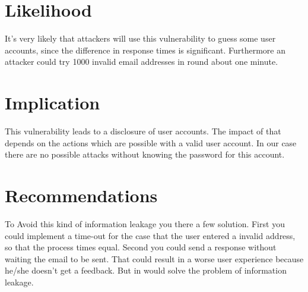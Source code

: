 \section{Likelihood}
It's very likely that attackers will use this vulnerability to guess some user accounts, since the difference in response times is significant. Furthermore an attacker could try 1000 invalid email addresses in round about one minute. 

\section{Implication} 
This vulnerability leads to a disclosure of user accounts. The impact of that depends on the actions which are possible with a valid user account. In our case there are no possible attacks without knowing the password for this account.


\section{Recommendations}
To Avoid this kind of information leakage you there a few solution. First you could implement a time-out for the case that the user entered a invalid address, so that the process times equal. Second you could send a response without waiting the email to be sent.
That could result in a worse user experience because he/she doesn't get a feedback. But in would solve the problem of information leakage.


